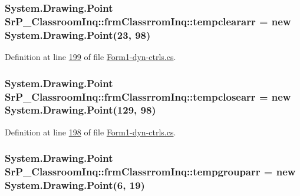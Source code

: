 \hypertarget{class_sr_p___classroom_inq_1_1frm_classrrom_inq_a189c01a3745fca62a8250be6a3517894}{
\subsubsection[{tempcleararr}]{\setlength{\rightskip}{0pt plus 5cm}\-System.\-Drawing.\-Point {\bf \-Sr\-P\-\_\-\-Classroom\-Inq\-::frm\-Classrrom\-Inq\-::tempcleararr} = new \-System.\-Drawing.\-Point(23, 98)}}
\label{class_sr_p___classroom_inq_1_1frm_classrrom_inq_a189c01a3745fca62a8250be6a3517894}


\-Definition at line \hyperlink{_form1-dyn-ctrls_8cs_source_l00199}{199} of file \hyperlink{_form1-dyn-ctrls_8cs_source}{\-Form1-\/dyn-\/ctrls.\-cs}.

\hypertarget{class_sr_p___classroom_inq_1_1frm_classrrom_inq_a6ad2bdb537cfc35b174dd16dd8e03904}{
\subsubsection[{tempclosearr}]{\setlength{\rightskip}{0pt plus 5cm}\-System.\-Drawing.\-Point {\bf \-Sr\-P\-\_\-\-Classroom\-Inq\-::frm\-Classrrom\-Inq\-::tempclosearr} = new \-System.\-Drawing.\-Point(129, 98)}}
\label{class_sr_p___classroom_inq_1_1frm_classrrom_inq_a6ad2bdb537cfc35b174dd16dd8e03904}


\-Definition at line \hyperlink{_form1-dyn-ctrls_8cs_source_l00198}{198} of file \hyperlink{_form1-dyn-ctrls_8cs_source}{\-Form1-\/dyn-\/ctrls.\-cs}.

\hypertarget{class_sr_p___classroom_inq_1_1frm_classrrom_inq_a6c8231644b9d1f92d08f110b003d621e}{
\subsubsection[{tempgrouparr}]{\setlength{\rightskip}{0pt plus 5cm}\-System.\-Drawing.\-Point {\bf \-Sr\-P\-\_\-\-Classroom\-Inq\-::frm\-Classrrom\-Inq\-::tempgrouparr} = new \-System.\-Drawing.\-Point(6, 19)}}
\label{class_sr_p___classroom_inq_1_1frm_classrrom_inq_a6c8231644b9d1f92d08f110b003d621e}


